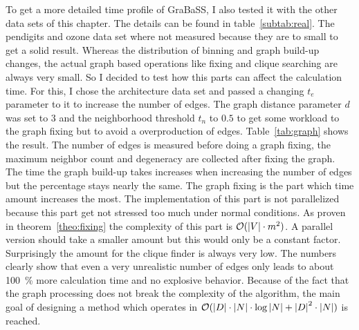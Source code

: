 To get a more detailed time profile of GraBaSS, I also tested it with the other data sets of this chapter. The details can be found in table~\ref{subtab:real}. The pendigits and ozone data set where not measured because they are to small to get a solid result. Whereas the distribution of binning and graph build-up changes, the actual graph based operations like fixing and clique searching are always very small. So I decided to test how this parts can affect the calculation time. For this, I chose the architecture data set and passed a changing $t_e$ parameter to it to increase the number of edges. The graph distance parameter $d$ was set to $3$ and the neighborhood threshold $t_n$ to $0.5$ to get some workload to the graph fixing but to avoid a overproduction of edges. Table~\ref{tab:graph} shows the result. The number of edges is measured before doing a graph fixing, the maximum neighbor count and degeneracy are collected after fixing the graph. The time the graph build-up takes increases when increasing the number of edges but the percentage stays nearly the same. The graph fixing is the part which time amount increases the most. The implementation of this part is not parallelized because this part get not stressed too much under normal conditions. As proven in theorem~\ref{theo:fixing} the complexity of this part is $\mathcal{O} ( \left|V\right| \cdot m^2 )$. A parallel version should take a smaller amount but this would only be a constant factor. Surprisingly the amount for the clique finder is always very low. The numbers clearly show that even a very unrealistic number of edges only leads to about \SI{100}{\percent} more calculation time and no explosive behavior. Because of the fact that the graph processing does not break the complexity of the algorithm, the main goal of designing a method which operates in $\mathcal{O} ( \left|D\right| \cdot \left|N\right| \cdot \log{\left|N\right|} + \left|D\right|^2 \cdot \left|N\right| )$ is reached.

